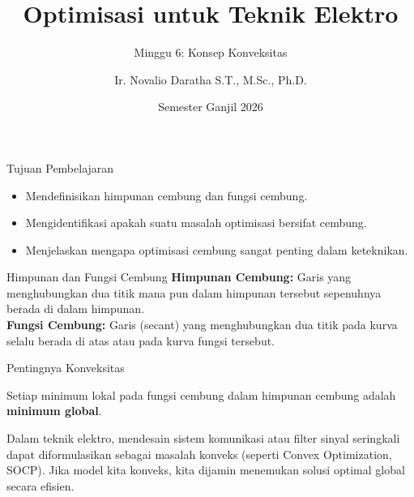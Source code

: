 \documentclass[aspectratio=169]{beamer}
\title{Optimisasi untuk Teknik Elektro}
\subtitle{Minggu 6: Konsep Konveksitas}
\author{Ir. Novalio Daratha S.T., M.Sc., Ph.D.}
\date{Semester Ganjil 2026}
\begin{document}
\begin{frame}\titlepage\end{frame}
\begin{frame}{Tujuan Pembelajaran}
\begin{itemize}
    \item Mendefinisikan himpunan cembung dan fungsi cembung.
    \item Mengidentifikasi apakah suatu masalah optimisasi bersifat cembung.
    \item Menjelaskan mengapa optimisasi cembung sangat penting dalam keteknikan.
\end{itemize}
\end{frame}
\begin{frame}{Himpunan dan Fungsi Cembung}
\textbf{Himpunan Cembung:} Garis yang menghubungkan dua titik mana pun dalam himpunan tersebut sepenuhnya berada di dalam himpunan.\\
\textbf{Fungsi Cembung:} Garis (secant) yang menghubungkan dua titik pada kurva selalu berada di atas atau pada kurva fungsi tersebut.
\end{frame}
\begin{frame}{Pentingnya Konveksitas}
\begin{tcolorbox}[colback=yellow!5,title=Sifat Emas Konveksitas]
Setiap minimum lokal pada fungsi cembung dalam himpunan cembung adalah \textbf{minimum global}.
\end{tcolorbox}
Dalam teknik elektro, mendesain sistem komunikasi atau filter sinyal seringkali dapat diformulasikan sebagai masalah konveks (seperti Convex Optimization, SOCP). Jika model kita konveks, kita dijamin menemukan solusi optimal global secara efisien.
\end{frame}
\end{document}
